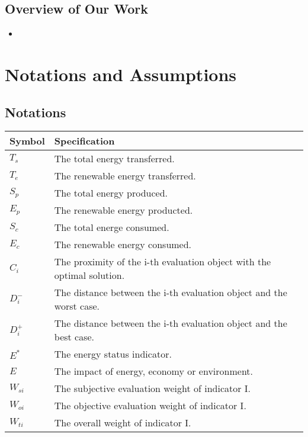 \documentclass{mcmthesis}
\begin{document}
\subsection{Overview of Our Work}
\begin{itemize}
  \item 
\end{itemize}

\section{Notations and Assumptions}
\subsection{Notations}
\begin{table}[H]
  \centering
  \begin{tabular}{ll}
    \toprule
    Symbol & Specification \\
    \toprule
    $T_s$  &  The total energy transferred. \\
    $T_e$  &  The renewable energy transferred.\\
    $S_p$  &  The total energy produced.\\
    $E_p$  &  The renewable energy producted.\\
    $S_c$  &  The total energe consumed.\\
    $E_c$  &  The renewable energy consumed.\\
    $C_i$  &  The proximity of the i-th evaluation object with the optimal solution.\\
    $D^-_i$  &  The distance between the i-th evaluation object and the worst case.\\
    $D^+_i$  &  The distance between the i-th evaluation object and the best case.\\
    $E^*$  &  The energy status indicator.\\
    $E$    &  The impact of energy, economy or environment.\\
    $W_{si}$  &  The subjective evaluation weight of indicator I.\\
    $W_{oi}$  &  The objective evaluation weight of indicator I.\\
    $W_{ti}$  &  The overall weight of indicator I.\\    

    \bottomrule
  \end{tabular}
\end{table}
\end{document}
